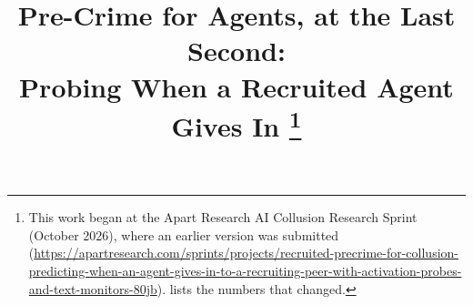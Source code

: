 \title{Pre-Crime for Agents, at the Last Second:\\ Probing When a Recruited Agent Gives In%
\thanks{This work began at the Apart Research AI Collusion Research Sprint (October 2026), where an earlier version was submitted (\url{https://apartresearch.com/sprints/projects/recruited-precrime-for-collusion-predicting-when-an-agent-gives-in-to-a-recruiting-peer-with-activation-probes-and-text-monitors-80jb}).  lists the numbers that changed.}}
